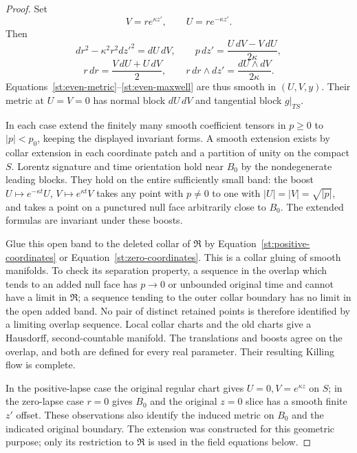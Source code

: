 \begin{proof}
Set
\begin{equation}\label{st:zero-coordinates}
 V=r e^{\kappa z'},\qquad U=r e^{-\kappa z'}.
\end{equation}
Then
\[
 dr^2-\kappa^2r^2dz'^2=dU\,dV,
 \qquad
 p\,dz'=\frac{U\,dV-V\,dU}{2\kappa},
\]
\[
 r\,dr=\frac{V\,dU+U\,dV}{2},
 \qquad r\,dr\wedge dz'=\frac{dU\wedge dV}{2\kappa}.
\]
Equations~\eqref{st:even-metric}--\eqref{st:even-maxwell} are thus
smooth in $(U,V,y)$.  Their metric at $U=V=0$ has normal block
$dU\,dV$ and tangential block $g|_{TS}$.

In each case extend the finitely many smooth coefficient tensors in
$p\geq0$ to $|p|<p_0$, keeping the displayed invariant forms.
A smooth extension exists by collar extension in each coordinate
patch and a partition of unity on the compact $S$.  Lorentz signature
and time orientation hold near $B_0$ by the nondegenerate leading
blocks.  They hold on the entire sufficiently small band: the boost
$U\mapsto e^{-\kappa t}U$, $V\mapsto e^{\kappa t}V$ takes any
point with $p\ne0$ to one with $|U|=|V|=\sqrt{|p|}$, and takes a
point on a punctured null face arbitrarily close to $B_0$.  The
extended formulas are invariant under these boosts.

Glue this open band to the deleted collar of $\mathfrak R$ by
Equation~\eqref{st:positive-coordinates} or
Equation~\eqref{st:zero-coordinates}.  This is a collar gluing of
smooth manifolds.  To check its separation property, a sequence in
the overlap which tends to an added null face has $p\to0$ or
unbounded original time and cannot have a limit in $\mathfrak R$;
a sequence tending to the outer collar boundary has no limit in the
open added band.  No pair of distinct retained points is therefore
identified by a limiting overlap sequence.  Local collar charts and
the old charts give a Hausdorff, second-countable manifold.  The
translations and boosts agree on the overlap, and both are defined
for every real parameter.  Their resulting Killing flow is complete.

In the positive-lapse case the original regular chart gives
$U=0,V=e^{\kappa z}$ on $S$; in the zero-lapse case $r=0$ gives
$B_0$ and the original $z=0$ slice has a smooth finite $z'$ offset.
These observations also identify the induced metric on $B_0$ and
the indicated original boundary.  The extension was constructed
for this geometric purpose; only its restriction to $\mathfrak R$
is used in the field equations below.
\end{proof}


